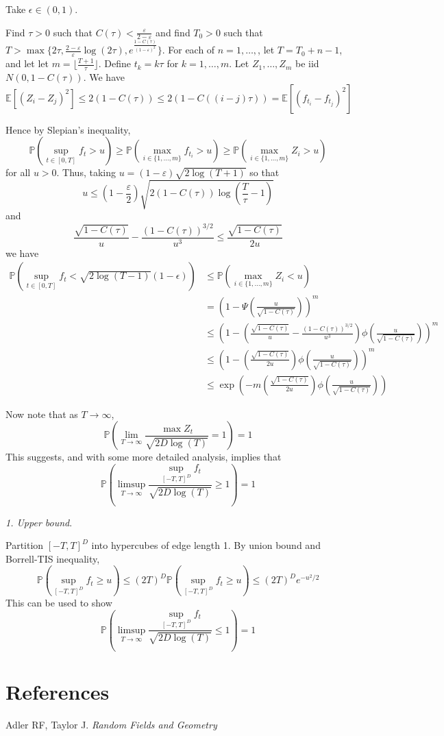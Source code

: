 \documentclass[11pt]{article}
\begin{document}
Take $\epsilon \in (0,1)$.

Find $\tau > 0$ such that $C(\tau) <
\frac{\varepsilon}{2-\varepsilon}$ and find $T_0 > 0$ such that $T > \max\{ 2\tau,\frac{2-\varepsilon}{\varepsilon} \log(2\tau), e^{\frac{1-C(\tau)}{(1-\varepsilon)^2}}\}$.  For each of $n =
1,\hdots,$, let $T = T_0 + n - 1$, and let let $m = \lfloor
\frac{T+1}{\tau} \rfloor$.  Define $t_k = k\tau$ for $k = 1,\hdots,m$.
Let $Z_1,\hdots, Z_m$ be iid $N(0,1-C(\tau))$.  We have
\[
\mathbb{E}[(Z_i - Z_j)^2] \leq 2(1-C(\tau)) \leq 2(1-C((i-j)\tau)) = \mathbb{E}[(f_{t_i}-f_{t_j})^2]
\]

Hence by Slepian's inequality,
\[
\mathbb{P}(\sup_{t \in [0,T]} f_t > u) \geq
\mathbb{P}(\max_{i \in \{1,\hdots,m\}} f_{t_i} > u) \geq
\mathbb{P}(\max_{i \in \{1,\hdots,m\}} Z_i > u)\]
for all $u > 0$.
Thus, taking $u = (1-\varepsilon)\sqrt{2\log(T+1)}$
so that
\[
u \leq 
\left(1-\frac{\varepsilon}{2}\right) \sqrt{2(1-C(\tau)) \log\left(\frac{T}{\tau}-1\right)}
\]
and
\[
\frac{\sqrt{1-C(\tau)}}{u} - \frac{(1-C(\tau))^{3/2}}{u^3} \leq \frac{\sqrt{1-C(\tau)}}{2u}
\]
we have
\begin{align}
\mathbb{P}(\sup_{t \in [0,T]} f_t < \sqrt{2\log (T-1)}(1-\epsilon))
&\leq \mathbb{P}(\max_{i \in \{1,\hdots,m\}} Z_i < u)
\\&= \left(1-\Psi\left(\frac{u}{\sqrt{1-C(\tau)}}\right)\right)^m
\\&\leq \left(1-\left(\frac{\sqrt{1-C(\tau)}}{u} - \frac{(1-C(\tau))^{3/2}}{u^3}\right)\phi\left(\frac{u}{\sqrt{1-C(\tau)}}\right)\right)^m
\\&\leq \left(1-\left(\frac{\sqrt{1-C(\tau)}}{2u}\right)\phi\left(\frac{u}{\sqrt{1-C(\tau)}}\right)\right)^m
\\& \leq \exp\left(-m\left(\frac{\sqrt{1-C(\tau)}}{2u}\right)\phi\left(\frac{u}{\sqrt{1-C(\tau)}}\right)\right) 
\end{align}

Now note
that as $T \to \infty$,
\[
\mathbb{P}\left(\lim_{T \to \infty}\frac{\max
    Z_t}{\sqrt{2D\log(T)}} = 1
\right) = 1
\]
This suggests, and with some more detailed analysis, implies that
\[
\mathbb{P}\left(\limsup_{T \to \infty}\frac{\sup_{[-T,T]^D}
    f_t}{\sqrt{2D\log(T)}} \geq 1
\right) = 1
\]

\emph{1. Upper bound}.

Partition $[-T,T]^D$ into hypercubes of edge length 1.
By union bound and Borrell-TIS inequality,
\[\mathbb{P}(\sup_{[-T,T]^D} f_t \geq u) \leq (2T)^D
\mathbb{P}(\sup_{[-T,T]^D} f_t \geq u) \leq (2T)^D e^{-u^2/2}\]
This can be used to show
\[
\mathbb{P}\left(\limsup_{T \to \infty}\frac{\sup_{[-T,T]^D}
    f_t}{\sqrt{2D\log(T)}} \leq 1
\right) = 1
\]




\section{References}

Adler RF, Taylor J. \emph{Random Fields and Geometry}
\end{document}
